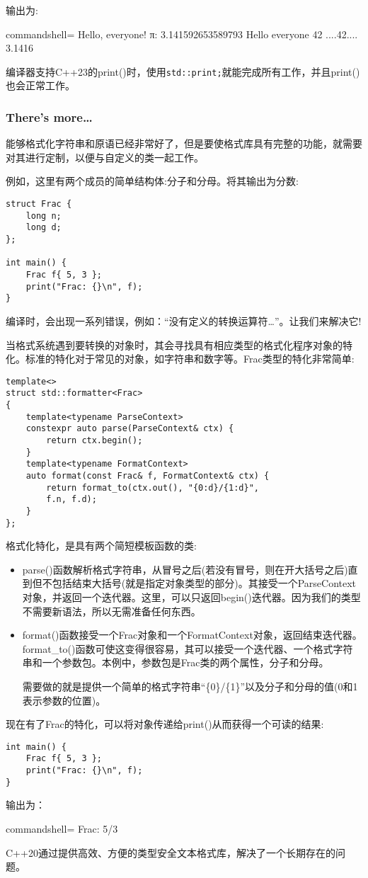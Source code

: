 输出为:

\begin{tcblisting}{commandshell={}}
Hello, everyone!
π: 3.141592653589793
Hello everyone 42
....42....
3.1416
\end{tcblisting}

编译器支持C++23的print()时，使用\texttt{std::print;}就能完成所有工作，并且print()也会正常工作。

\subsubsection{There's more…}

能够格式化字符串和原语已经非常好了，但是要使格式库具有完整的功能，就需要对其进行定制，以便与自定义的类一起工作。

例如，这里有两个成员的简单结构体:分子和分母。将其输出为分数:

\begin{lstlisting}[style=styleCXX]
struct Frac {
	long n;
	long d;
};

int main() {
	Frac f{ 5, 3 };
	print("Frac: {}\n", f);
}
\end{lstlisting}

编译时，会出现一系列错误，例如：“没有定义的转换运算符…”。让我们来解决它!

当格式系统遇到要转换的对象时，其会寻找具有相应类型的格式化程序对象的特化。标准的特化对于常见的对象，如字符串和数字等。Frac类型的特化非常简单:

\begin{lstlisting}[style=styleCXX]
template<>
struct std::formatter<Frac>
{
	template<typename ParseContext>
	constexpr auto parse(ParseContext& ctx) {
		return ctx.begin();
	}
	template<typename FormatContext>
	auto format(const Frac& f, FormatContext& ctx) {
		return format_to(ctx.out(), "{0:d}/{1:d}",
		f.n, f.d);
	}
};
\end{lstlisting}

格式化特化，是具有两个简短模板函数的类:

\begin{itemize}
\item 
parse()函数解析格式字符串，从冒号之后(若没有冒号，则在开大括号之后)直到但不包括结束大括号(就是指定对象类型的部分)。其接受一个ParseContext对象，并返回一个迭代器。这里，可以只返回begin()迭代器。因为我们的类型不需要新语法，所以无需准备任何东西。

\item 
format()函数接受一个Frac对象和一个FormatContext对象，返回结束迭代器。format\_to()函数可使这变得很容易，其可以接受一个迭代器、一个格式字符串和一个参数包。本例中，参数包是Frac类的两个属性，分子和分母。

需要做的就是提供一个简单的格式字符串“\{0\}/\{1\}”以及分子和分母的值(0和1表示参数的位置)。
\end{itemize}

现在有了Frac的特化，可以将对象传递给print()从而获得一个可读的结果:

\begin{lstlisting}[style=styleCXX]
int main() {
	Frac f{ 5, 3 };
	print("Frac: {}\n", f);
}
\end{lstlisting}

输出为：

\begin{tcblisting}{commandshell={}}
Frac: 5/3
\end{tcblisting}

C++20通过提供高效、方便的类型安全文本格式库，解决了一个长期存在的问题。


